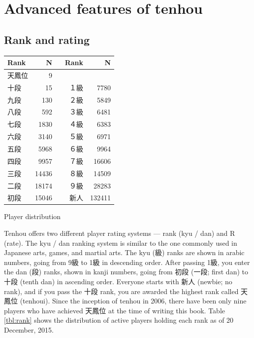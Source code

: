 \chapter{Advanced features of {\jap tenhou}} \label{ch:tenhou2}
\thispagestyle{fancy}

\section{Rank and rating}

\begin{floatingtable}[r]{
\footnotesize \captionsetup{font=footnotesize}
\centering 
\begin{tabular}{l r r r}
\toprule
Rank & N & Rank & N\\
\midrule
天鳳位	&9\\
十段	&15&	１級	&7780\\
九段	&130&	２級	&5849\\
八段	&592&	３級	&6481\\
七段	&1830&	４級	&6383\\
六段	&3140&	５級	&6971\\
五段	&5968&	６級	&9964\\
四段	&9957&	７級	&16606\\
三段	&14436&	８級	&14509\\
二段	&18174&	９級	&28283\\
初段	&15046&	~~~新人&132411\\
\bottomrule
\end{tabular}}
\caption{Player distribution} \label{tbl:rank}
\end{floatingtable}

{\jap Tenhou} offers two different player rating systems --- rank ({\jap kyu / dan}) and R (rate). 
The {\jap kyu / dan} ranking system is similar to the one commonly used in Japanese arts, games, and martial arts. 
The {\jap kyu} (級) ranks are shown in arabic numbers, going from 9級 to 1級 in descending order. After passing 1級, you enter the {\jap dan} (段) ranks, shown in {\jap kanji} numbers, going from 初段 (一段; first {\jap dan}) to 十段 (tenth {\jap dan}) in ascending order. Everyone starts with {\jap 新人} (newbie; no rank), and if you pass the 十段 rank, you are awarded the highest rank called 天鳳位 ({\jap tenhoui}). Since the inception of {\jap tenhou} in 2006, there have been only nine players who have achieved 天鳳位 at the time of writing this book. 
Table \ref{tbl:rank} shows the distribution of active players holding each rank as of 20 December, 2015. 

